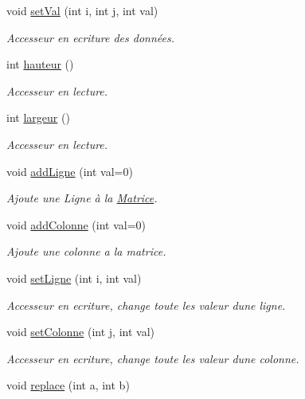 \begin{DoxyCompactItemize}
void \hyperlink{class_matrice_acfbf84f67a67b40c08239217caab14a9}{set\+Val} (int i, int j, int val)
\begin{DoxyCompactList}\small\item\em Accesseur en ecriture des données. \end{DoxyCompactList}\item 
int \hyperlink{class_matrice_a40c26a2a701faf2b1680886a8aeeadaf}{hauteur} ()
\begin{DoxyCompactList}\small\item\em Accesseur en lecture. \end{DoxyCompactList}\item 
int \hyperlink{class_matrice_a01649b7f1fb32a6a8561c308a22bd22f}{largeur} ()
\begin{DoxyCompactList}\small\item\em Accesseur en lecture. \end{DoxyCompactList}\item 
void \hyperlink{class_matrice_a6c119431b7a8641c5b6ea19bce336036}{add\+Ligne} (int val=0)
\begin{DoxyCompactList}\small\item\em Ajoute une Ligne à la \hyperlink{class_matrice}{Matrice}. \end{DoxyCompactList}\item 
void \hyperlink{class_matrice_a64aff02cb523d7a5db9bb268f2012444}{add\+Colonne} (int val=0)
\begin{DoxyCompactList}\small\item\em Ajoute une colonne a la matrice. \end{DoxyCompactList}\item 
void \hyperlink{class_matrice_aa90563f9897d38e422c9459de72cfc34}{set\+Ligne} (int i, int val)
\begin{DoxyCompactList}\small\item\em Accesseur en ecriture, change toute les valeur d\textquotesingle{}une ligne. \end{DoxyCompactList}\item 
void \hyperlink{class_matrice_aa8cd6d3e8e1d5250a6b56423dc61fcc4}{set\+Colonne} (int j, int val)
\begin{DoxyCompactList}\small\item\em Accesseur en ecriture, change toute les valeur d\textquotesingle{}une colonne. \end{DoxyCompactList}\item 
void \hyperlink{class_matrice_ae71605cb8df11905415a76eae31d1ad7}{replace} (int a, int b)

\end{DoxyCompactItemize}
